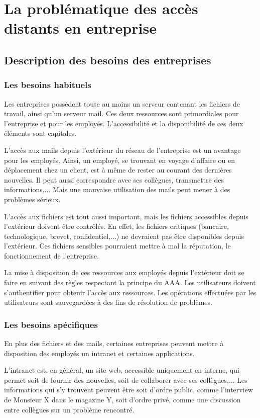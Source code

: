 \part{La problématique des accès distants en entreprise}
\chapter{Description des besoins des entreprises}
\section{Les besoins habituels}
Les entreprises possèdent toute au moins un serveur contenant les fichiers de travail, ainsi qu'un serveur mail.
Ces deux ressources sont primordiales pour l'entreprise et pour les employés.
L'accessibilité et la disponibilité de ces deux éléments sont capitales.

L'accès aux mails depuis l'extérieur du réseau de l'entreprise est un avantage pour les employés.
Ainsi, un employé, se trouvant en voyage d'affaire ou en déplacement chez un client, est à même de rester au courant des dernières nouvelles.
Il peut aussi correspondre avec ses collègues, transmettre des informations,...
Mais une mauvaise utilisation des mails peut mener à des problèmes sérieux.

L'accès aux fichiers est tout aussi important, mais les fichiers accessibles depuis l'extérieur doivent être contrôlés.
En effet, les fichiers critiques (bancaire, technologique, brevet, confidentiel,...) ne devraient pas être disponibles depuis l'extérieur.
Ces fichiers sensibles pourraient mettre à mal la réputation, le fonctionnement de l'entreprise.

La mise à disposition de ces ressources aux employés depuis l'extérieur doit se faire en suivant des règles respectant la principe du AAA.
Les utilisateurs doivent s'authentifier pour obtenir l'accès aux ressources.
Les opérations effectuées par les utilisateurs sont sauvegardées à des fins de résolution de problèmes.
\section{Les besoins spécifiques}
En plus des fichiers et des mails, certaines entreprises peuvent mettre à disposition des employés un intranet et certaines applications.

L'intranet est, en général, un site web, accessible uniquement en interne, qui permet soit de fournir des nouvelles, soit de collaborer avec ses collègues,...
Les informations qui s'y trouvent peuvent être soit d'ordre public, comme l'interview de Monsieur X dans le magazine Y, soit d'ordre privé, comme une discussion entre collègues sur un problème rencontré.

